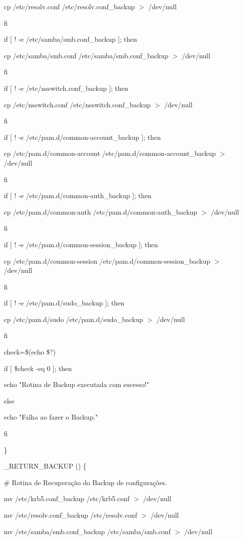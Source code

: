 		cp /etc/resolv.conf /etc/resolv.conf\_backup $>$ /dev/null

	fi

	if [ ! -e /etc/samba/smb.conf\_backup ]; then

        	cp /etc/samba/smb.conf /etc/samba/smb.conf\_backup $>$ /dev/null

	fi

	if [ ! -e /etc/nsswitch.conf\_backup ]; then

        	cp /etc/nsswitch.conf /etc/nsswitch.conf\_backup $>$ /dev/null

	fi

	if [ ! -e /etc/pam.d/common-account\_backup ]; then

	        cp /etc/pam.d/common-account /etc/pam.d/common-account\_backup $>$ /dev/null

	fi

	if [ ! -e /etc/pam.d/common-auth\_backup ]; then

	        cp /etc/pam.d/common-auth /etc/pam.d/common-auth\_backup $>$ /dev/null

	fi

	if [ ! -e /etc/pam.d/common-session\_backup ]; then

	        cp /etc/pam.d/common-session /etc/pam.d/common-session\_backup $>$ /dev/null

	fi

	if [ ! -e /etc/pam.d/sudo\_backup ]; then

	        cp /etc/pam.d/sudo /etc/pam.d/sudo\_backup $>$ /dev/null

	fi
         
        check=\$(echo \$?)

   if [ \$check -eq 0 ]; then

      echo "Rotina de Backup executada com sucesso!"

   else

      echo "Falha ao fazer o Backup."

   fi
         
\}

\_RETURN\_BACKUP () \{

        \# Rotina de Recuperação do Backup de configurações.

        mv /etc/krb5.conf\_backup /etc/krb5.conf $>$ /dev/null

        mv /etc/resolv.conf\_backup /etc/resolv.conf $>$ /dev/null

        mv /etc/samba/smb.conf\_backup /etc/samba/smb.conf $>$ /dev/null

